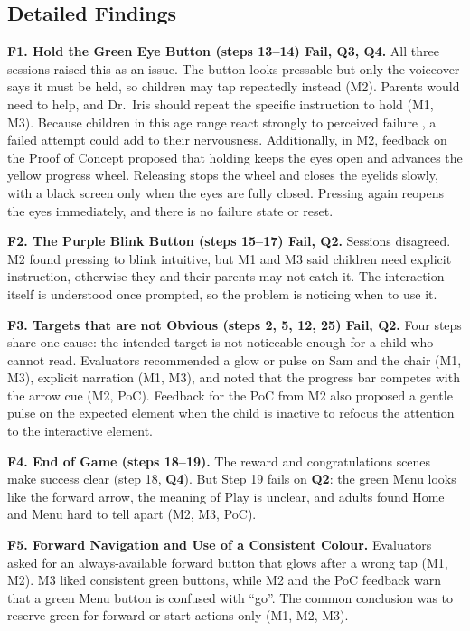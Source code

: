 \documentclass{article}
\newcommand{\fail}{{\textbf{Fail}}}
\newcommand{\crit}[1]{\textbf{Q#1}}
\begin{document}
\subsection{Detailed Findings}

\textbf{F1. Hold the Green Eye Button (steps 13--14) \fail{}, \crit{3}, \crit{4}.}
All three sessions raised this as an issue. The button looks pressable but only the voiceover says it must be held, 
so children may tap repeatedly instead (M2). Parents would need to help, and Dr.~Iris should repeat the specific 
instruction to hold (M1, M3). Because children in this age range react strongly to perceived failure \cite{SRS}, a 
failed attempt could add to their nervousness. Additionally, in M2, feedback on the Proof of Concept proposed that 
holding keeps the eyes open and advances the yellow progress wheel. Releasing stops the wheel and closes the eyelids 
slowly, with a black screen only when the eyes are fully closed. Pressing again reopens the eyes immediately, and 
there is no failure state or reset.

\textbf{F2. The Purple Blink Button (steps 15--17) \fail{}, \crit{2}.}
Sessions disagreed. M2 found pressing to blink intuitive, but M1 and M3 said children need explicit instruction, otherwise 
they and their parents may not catch it. The interaction itself is understood once prompted, so the problem is noticing when 
to use it.

\textbf{F3. Targets that are not Obvious (steps 2, 5, 12, 25) \fail{}, \crit{2}.}
Four steps share one cause: the intended target is not noticeable enough for a child who cannot read. Evaluators recommended 
a glow or pulse on Sam and the chair (M1, M3), explicit narration (M1, M3), and noted that the progress bar competes with 
the arrow cue (M2, PoC). Feedback for the PoC from M2 also proposed a gentle pulse on the expected element when the child is 
inactive to refocus the attention to the interactive element.

\textbf{F4. End of Game (steps 18--19).}
The reward and congratulations scenes make success clear (step 18, \crit{4}). But Step 19 fails on \crit{2}: the green Menu 
looks like the forward arrow, the meaning of Play is unclear, and adults found Home and Menu hard to tell apart (M2, M3, PoC).

\textbf{F5. Forward Navigation and Use of a Consistent Colour.}
Evaluators asked for an always-available forward button that glows after a wrong tap (M1, M2). M3 liked consistent green buttons, 
while M2 and the PoC feedback warn that a green Menu button is confused with ``go''. The common conclusion was to reserve 
green for forward or start actions only (M1, M2, M3).
\end{document}
